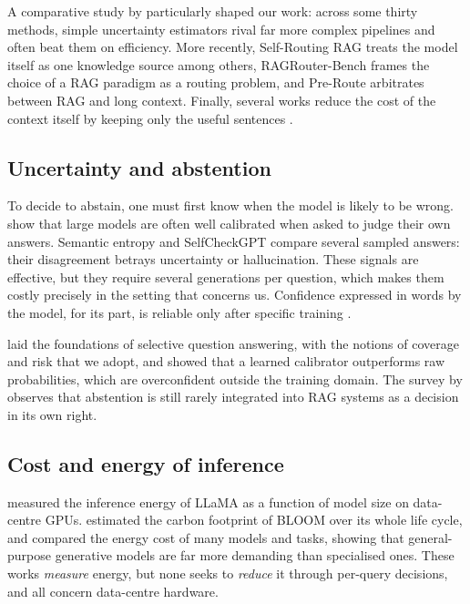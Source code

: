 \documentclass[11pt,a4paper]{article}
\begin{document}
A comparative study by \citet{moskvoretskii2025adaptive} particularly shaped our work: across some
thirty methods, simple uncertainty estimators rival far more complex pipelines and often beat them on
efficiency. More recently, Self-Routing RAG \citep{wu2025srrag} treats the model itself as one knowledge
source among others, RAGRouter-Bench \citep{wang2026ragrouterbench} frames the choice of a RAG paradigm
as a routing problem, and Pre-Route \citep{chen2026preroute} arbitrates between RAG and long context.
Finally, several works reduce the cost of the context itself by keeping only the useful sentences
\citep{arefeen2024leancontext,akesson2024clustered,chen2026logicrag}.

\subsection{Uncertainty and abstention}

To decide to abstain, one must first know when the model is likely to be wrong.
\citet{kadavath2022know} show that large models are often well calibrated when asked to judge their own
answers. Semantic entropy \citep{kuhn2023semantic} and SelfCheckGPT \citep{manakul2023selfcheckgpt}
compare several sampled answers: their disagreement betrays uncertainty or hallucination. These signals
are effective, but they require several generations per question, which makes them costly precisely in
the setting that concerns us. Confidence expressed in words by the model, for its part, is reliable only
after specific training \citep{lin2022verbal}.

\citet{kamath2020selective} laid the foundations of selective question answering, with the notions of
coverage and risk that we adopt, and showed that a learned calibrator outperforms raw probabilities,
which are overconfident outside the training domain. The survey by \citet{wen2024abstention} observes
that abstention is still rarely integrated into RAG systems as a decision in its own right.

\subsection{Cost and energy of inference}

\citet{samsi2023watts} measured the inference energy of LLaMA as a function of model size on
data-centre GPUs. \citet{luccioni2022bloom} estimated the carbon footprint of BLOOM over its whole life
cycle, and \citet{luccioni2024power} compared the energy cost of many models and tasks, showing that
general-purpose generative models are far more demanding than specialised ones. These works
\emph{measure} energy, but none seeks to \emph{reduce} it through per-query decisions, and all concern
data-centre hardware.
\end{document}
